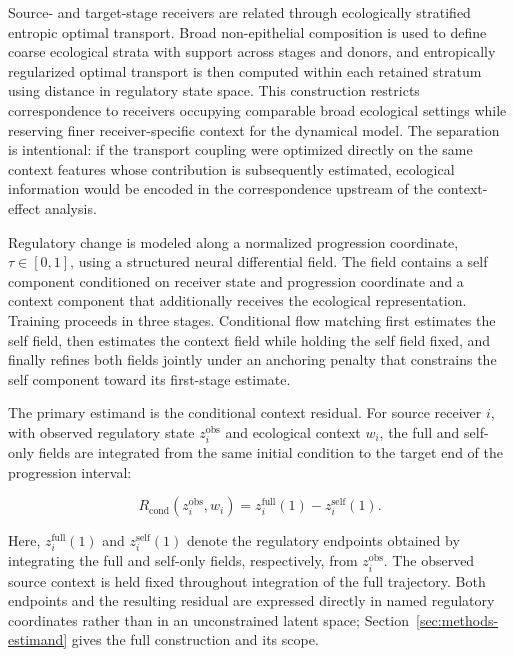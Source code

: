 Source- and target-stage receivers are related through ecologically stratified entropic optimal transport. Broad non-epithelial composition is used to define coarse ecological strata with support across stages and donors,
and entropically regularized optimal transport is then computed within each retained stratum using distance in regulatory state space. This construction restricts correspondence to receivers occupying comparable broad ecological settings while reserving finer receiver-specific context for the dynamical model. The separation is intentional: if the transport coupling were optimized directly on the same context features whose contribution is subsequently
estimated, ecological information would be encoded in the correspondence upstream of the context-effect analysis.

Regulatory change is modeled along a normalized progression coordinate,
\(\tau \in [0,1]\), using a structured neural differential field. The field contains a self component conditioned on receiver state and progression
coordinate and a context component that additionally receives the ecological
representation. Training proceeds in three stages. Conditional flow matching
first estimates the self field, then estimates the context field while holding
the self field fixed, and finally refines both fields jointly under an anchoring penalty that
constrains the self component toward its first-stage estimate.

The primary estimand is the conditional context residual. For source receiver
\(i\), with observed regulatory state \(z_i^{\mathrm{obs}}\) and ecological
context \(w_i\), the full and self-only fields are integrated from the same
initial condition to the target end of the progression interval:

\begin{equation}
R_{\mathrm{cond}}\!\left(z_i^{\mathrm{obs}},w_i\right)
=
z_i^{\mathrm{full}}(1)
-
z_i^{\mathrm{self}}(1).
\label{eq:methods-rcond-overview}
\end{equation}

Here, \(z_i^{\mathrm{full}}(1)\) and \(z_i^{\mathrm{self}}(1)\) denote the
regulatory endpoints obtained by integrating the full and self-only fields,
respectively, from \(z_i^{\mathrm{obs}}\). The observed source context is held
fixed throughout integration of the full trajectory. Both endpoints and the
resulting residual are expressed directly in named regulatory coordinates
rather than in an unconstrained latent space; Section~\ref{sec:methods-estimand}
gives the full construction and its scope.

